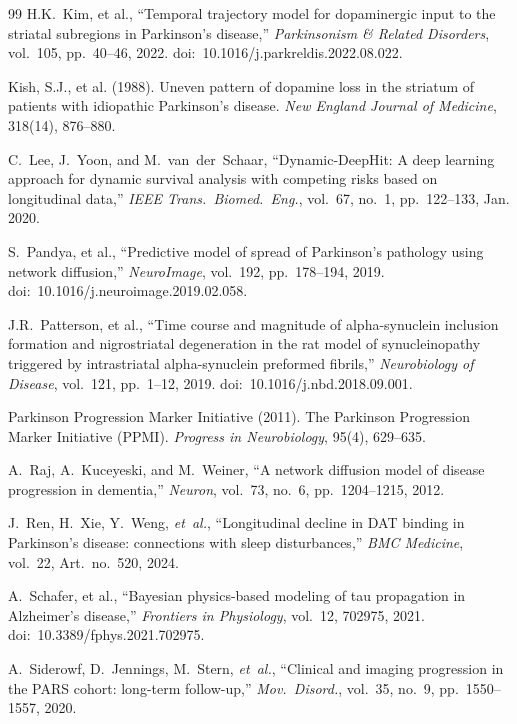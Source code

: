 \begin{thebibliography}{99}
H.K.~Kim, et al., ``Temporal trajectory model for dopaminergic input to the striatal subregions in Parkinson's disease,'' \textit{Parkinsonism \& Related Disorders}, vol.~105, pp.~40--46, 2022. doi:~10.1016/j.parkreldis.2022.08.022.

Kish, S.J., et al. (1988).
\newblock Uneven pattern of dopamine loss in the striatum of patients with idiopathic Parkinson's disease.
\newblock \emph{New England Journal of Medicine}, 318(14), 876--880.

C.~Lee, J.~Yoon, and M.~van~der~Schaar, ``Dynamic-DeepHit: A deep learning approach for dynamic survival analysis with competing risks based on longitudinal data,'' \textit{IEEE Trans.\ Biomed.\ Eng.}, vol.~67, no.~1, pp.~122--133, Jan. 2020.

S.~Pandya, et al., ``Predictive model of spread of Parkinson's pathology using network diffusion,'' \textit{NeuroImage}, vol.~192, pp.~178--194, 2019. doi:~10.1016/j.neuroimage.2019.02.058.

J.R.~Patterson, et al., ``Time course and magnitude of alpha-synuclein inclusion formation and nigrostriatal degeneration in the rat model of synucleinopathy triggered by intrastriatal alpha-synuclein preformed fibrils,'' \textit{Neurobiology of Disease}, vol.~121, pp.~1--12, 2019. doi:~10.1016/j.nbd.2018.09.001.

Parkinson Progression Marker Initiative (2011).
\newblock The Parkinson Progression Marker Initiative (PPMI).
\newblock \emph{Progress in Neurobiology}, 95(4), 629--635.

A.~Raj, A.~Kuceyeski, and M.~Weiner, ``A network diffusion model of disease progression in dementia,'' \textit{Neuron}, vol.~73, no.~6, pp.~1204--1215, 2012.

J.~Ren, H.~Xie, Y.~Weng, \textit{et~al.}, ``Longitudinal decline in DAT binding in Parkinson's disease: connections with sleep disturbances,'' \textit{BMC Medicine}, vol.~22, Art.\ no.~520, 2024.

A.~Schafer, et al., ``Bayesian physics-based modeling of tau propagation in Alzheimer's disease,'' \textit{Frontiers in Physiology}, vol.~12, 702975, 2021. doi:~10.3389/fphys.2021.702975.

A.~Siderowf, D.~Jennings, M.~Stern, \textit{et~al.}, ``Clinical and imaging progression in the PARS cohort: long-term follow-up,'' \textit{Mov.\ Disord.}, vol.~35, no.~9, pp.~1550--1557, 2020.


\end{thebibliography}
